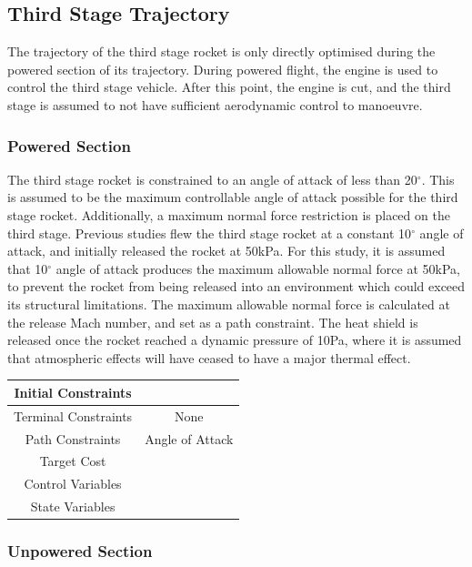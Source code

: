 \subsection{Third Stage Trajectory}

The trajectory of the third stage rocket is only directly optimised during the powered section of its trajectory. During powered flight, the engine is used to control the third stage vehicle. After this point, the engine is cut, and the third stage is assumed to not have sufficient aerodynamic control to manoeuvre. 

\subsubsection{Powered Section}

The third stage rocket is constrained to an angle of attack of less than 20$^\circ$. This is assumed to be the maximum controllable angle of attack possible for the third stage rocket.   
Additionally, a maximum normal force restriction is placed on the third stage. Previous studies flew the third stage rocket at a constant 10$^\circ$ angle of attack, and initially released the rocket at 50kPa. 
For this study, it is assumed that 10$^\circ$ angle of attack produces the maximum allowable normal force at 50kPa, to prevent the rocket from being released into an environment which could exceed its structural limitations. The maximum allowable normal force is calculated at the release Mach number, and set as a path constraint. 
The heat shield is released once the rocket reached a dynamic pressure of 10Pa, where it is assumed that atmospheric effects will have ceased to have a major thermal effect. 

\begin{tabular}{|c|c|}
	\hline Initial Constraints  & \\ 
	\hline Terminal Constraints & None \\ 
	\hline Path Constraints & Angle of Attack \\ 
	\hline Target Cost &  \\ 
				\hline Control Variables &  \\ 
				\hline State Variables &  \\ 
	\hline 
\end{tabular} 


\subsubsection{Unpowered Section}

